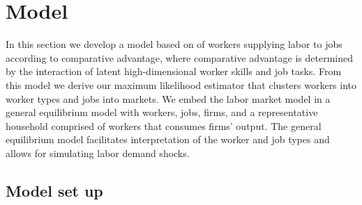 \documentclass[12pt]{article}
\theoremstyle{definition}
\theoremstyle{plain}
\begin{document}
\section{Model}
\label{sec:model}


In this section we develop a model based on \citet{Grigsby2019} of workers supplying labor to jobs according to comparative advantage, where comparative advantage is determined by the interaction of latent high-dimensional worker skills and job tasks. From this model we derive our maximum likelihood estimator that clusters workers into worker types and jobs into markets. We embed the labor market model in a general equilibrium model with workers, jobs, firms, and a representative household comprised of workers that consumes firms' output. The general equilibrium model facilitates interpretation of the worker and job types and allows for simulating labor demand shocks.

\subsection{Model set up}
\end{document}

